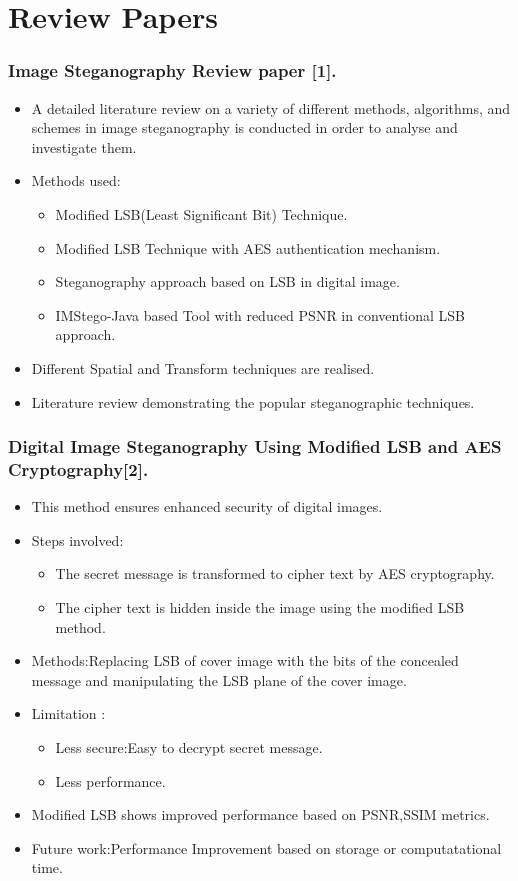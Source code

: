 \documentclass{beamer} %
\theoremstyle{definition} %
\begin{document}
\section{Review Papers}
\begin{frame}
\frametitle{Image Steganography Review paper [1].}
\begin{itemize}
	\item{ A detailed literature review on a
		variety of different methods, algorithms, and schemes in image steganography is conducted in order to analyse and
		investigate them.
	}
   \item{Methods used:}
   \begin{itemize}
   	\item{Modified LSB(Least Significant Bit) Technique. }
   	\item{Modified LSB Technique with AES authentication mechanism.  }
   	\item{Steganography approach based on LSB in digital image.  }
   	\item{IMStego-Java based Tool with reduced PSNR in conventional LSB approach. }
   \end{itemize}
   \item{ Different Spatial and Transform techniques are realised.  }
   \item{Literature review demonstrating the popular steganographic techniques.}
\end{itemize}
\end{frame}

\begin{frame}
\frametitle{Digital Image Steganography Using Modified LSB and AES Cryptography[2].}
\begin{itemize}
	\item{ This method ensures enhanced security of digital images.  }
	\item {Steps involved:}
	\begin{itemize}
	\item{The secret message is transformed to cipher text by AES cryptography.}
	\item{ The cipher text is hidden inside the image using the modified LSB method.}
	\end{itemize}
	\item{Methods:Replacing LSB of cover image with the bits of the concealed message and manipulating the LSB plane of the cover image.}
	\item{Limitation :}
	\begin{itemize}
		\item {Less secure:Easy to decrypt secret message.}
		\item {Less performance.}
	\end{itemize}
	\item{Modified LSB shows improved performance based on PSNR,SSIM metrics.} 
	\item{Future work:Performance Improvement based on storage or computatational time.}
\end{itemize}
\end{frame}
\end{document}
